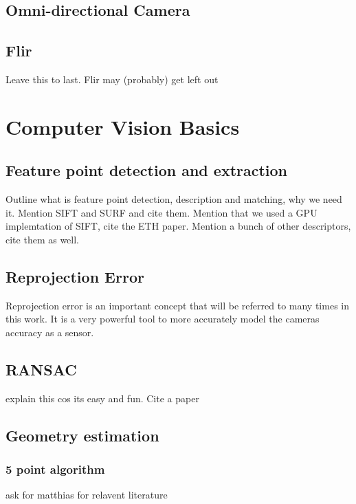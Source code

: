 \subsection{Omni-directional Camera}


\subsection{Flir}
Leave this to last.  Flir may (probably) get left out

\section{Computer Vision Basics}

\subsection{Feature point detection and extraction}
\label{subsec:features}

Outline what is feature point detection, description and matching, why we need
it.  Mention SIFT
and SURF and cite them.  Mention that we used a GPU implemtation of SIFT, cite
the ETH paper. 
Mention a bunch of other descriptors, cite them as well.

\subsection{Reprojection Error}

Reprojection error is an important concept that will be referred to many times in this work.  It is
a very powerful tool to more accurately model the cameras accuracy as a sensor.

\subsection{RANSAC}
\label{subsec:RANSAC}

explain this cos its easy and fun.  Cite a paper

\subsection{Geometry estimation}

\subsubsection{5 point algorithm}
\label{subsec:5point}
ask for matthias for relavent literature

